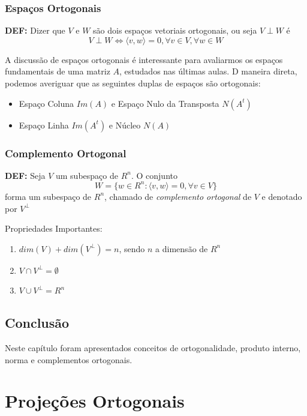 \documentclass[12pt]{article}
\begin{document}
	\subsubsection{Espaços Ortogonais}
	\textbf{DEF:} Dizer que $V$ e $W$ são dois espaços vetoriais ortogonais, ou seja $V\perp W$ é
	\begin{equation*}
		V\perp W\iff \langle v,w \rangle=0, \forall v\in V,\forall w\in W
	\end{equation*}
	
	A discussão de espaços ortogonais é interessante para avaliarmos os espaços fundamentais de uma matriz $A$, estudados nas últimas aulas. D maneira direta, podemos averiguar que as seguintes duplas de espaços são ortogonais:
	\begin{itemize}
		\item Espaço Coluna $Im(A)$ e Espaço Nulo da Transposta $N(A^{t})$
		\item Espaço Linha $Im(A^{t})$ e Núcleo $N(A)$
	\end{itemize}
	
	\subsubsection{Complemento Ortogonal}
	\textbf{DEF:} Seja $V$ um subespaço de $R^{n}$. O conjunto 
	\begin{equation*}
		W=\{w\in R^n :\langle v,w \rangle=0,\forall v\in V\}
	\end{equation*}
	forma um subespaço de $R^n$, chamado de \textit{complemento ortogonal} de $V$ e denotado por $V^{\perp}$
	
	Propriedades Importantes:
	\begin{enumerate}
		\item $dim(V)+dim(V^{\perp})=n$, sendo $n$ a dimensão de $R^n$
		\item $V \cap V^{\perp}=\emptyset$
		\item $V \cup V^{\perp}=R^n$
	\end{enumerate}
	\subsection{Conclusão}
	Neste capítulo foram apresentados conceitos de ortogonalidade, produto interno, norma e complementos ortogonais. 
	
	\section{Projeções Ortogonais}
	
\end{document}
